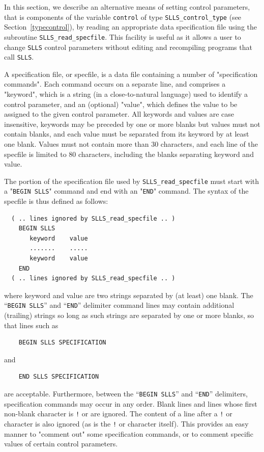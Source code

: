 \documentclass{galahad}
\newcommand{\packagename}{SLLS}
\begin{document}

\galfeatures
\noindent In this section, we describe an alternative means of setting
control parameters, that is components of the variable {\tt control} of type
{\tt \packagename\_control\_type}
(see Section~\ref{typecontrol}),
by reading an appropriate data specification file using the
subroutine {\tt \packagename\_read\_specfile}. This facility
is useful as it allows a user to change  {\tt \packagename} control parameters
without editing and recompiling programs that call {\tt \packagename}.

A specification file, or specfile, is a data file containing a number of
"specification commands". Each command occurs on a separate line,
and comprises a "keyword",
which is a string (in a close-to-natural language) used to identify a
control parameter, and
an (optional) "value", which defines the value to be assigned to the given
control parameter. All keywords and values are case insensitive,
keywords may be preceded by one or more blanks but
values must not contain blanks, and
each value must be separated from its keyword by at least one blank.
Values must not contain more than 30 characters, and
each line of the specfile is limited to 80 characters,
including the blanks separating keyword and value.

The portion of the specification file used by
{\tt \packagename\_read\_specfile}
must start
with a "{\tt BEGIN \packagename}" command and end with an
"{\tt END}" command.  The syntax of the specfile is thus defined as follows:
\begin{verbatim}
  ( .. lines ignored by SLLS_read_specfile .. )
    BEGIN SLLS
       keyword    value
       .......    .....
       keyword    value
    END
  ( .. lines ignored by SLLS_read_specfile .. )
\end{verbatim}
where keyword and value are two strings separated by (at least) one blank.
The ``{\tt BEGIN \packagename}'' and ``{\tt END}'' delimiter command lines
may contain additional (trailing) strings so long as such strings are
separated by one or more blanks, so that lines such as
\begin{verbatim}
    BEGIN SLLS SPECIFICATION
\end{verbatim}
and
\begin{verbatim}
    END SLLS SPECIFICATION
\end{verbatim}
are acceptable. Furthermore,
between the
``{\tt BEGIN \packagename}'' and ``{\tt END}'' delimiters,
specification commands may occur in any order.  Blank lines and
lines whose first non-blank character is {\tt !} or {\tt *} are ignored.
The content
of a line after a {\tt !} or {\tt *} character is also
ignored (as is the {\tt !} or {\tt *}
character itself). This provides an easy manner to "comment out" some
specification commands, or to comment specific values
of certain control parameters.
\end{document}
